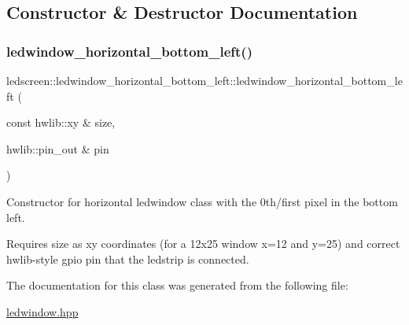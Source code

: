 \subsection{Constructor \& Destructor Documentation}
\mbox{\label{classledscreen_1_1ledwindow__horizontal__bottom__left_a08b0b9816b21372ccda9f1dc6b45cf90}} 
\subsubsection{\texorpdfstring{ledwindow\+\_\+horizontal\+\_\+bottom\+\_\+left()}{ledwindow\_horizontal\_bottom\_left()}}
{\footnotesize\ttfamily ledscreen\+::ledwindow\+\_\+horizontal\+\_\+bottom\+\_\+left\+::ledwindow\+\_\+horizontal\+\_\+bottom\+\_\+left (\begin{DoxyParamCaption}\item[{const hwlib\+::xy \&}]{size,  }\item[{hwlib\+::pin\+\_\+out \&}]{pin }\end{DoxyParamCaption})\hspace{0.3cm}{\ttfamily [inline]}}



Constructor for horizontal ledwindow class with the 0th/first pixel in the bottom left. 

Requires size as xy coordinates (for a 12x25 window x=12 and y=25) and correct hwlib-\/style gpio pin that the ledstrip is connected. 

The documentation for this class was generated from the following file\+:\begin{DoxyCompactItemize}
\item 
\hyperlink{ledwindow_8hpp}{ledwindow.\+hpp}\end{DoxyCompactItemize}
